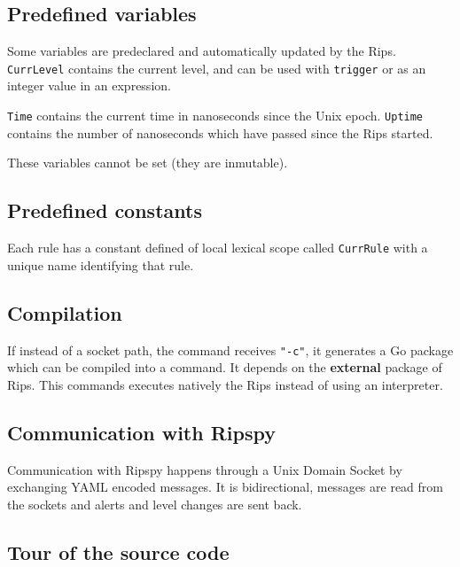 \documentclass[a4paper]{article}
\begin{document}
\subsection{Predefined variables}
Some variables are predeclared and automatically updated by the Rips.
\verb+CurrLevel+ contains the current level, and can be used with \texttt{trigger}  or
as an integer value in an expression.

\verb+Time+ contains the current time in nanoseconds since the Unix epoch.
\verb+Uptime+ contains the number of nanoseconds which have passed since
the Rips started.

These variables cannot be set (they are inmutable).

\subsection{Predefined constants}

Each rule has a constant defined of local lexical scope called \verb+CurrRule+ with
a unique name identifying that rule.

\subsection{Compilation}

If instead of a socket path, the command receives \verb+"-c"+, it generates a Go
package which can be compiled into a command. It depends on the \textbf{external}
package of Rips.
This commands executes natively the Rips instead of using an interpreter.

\subsection{Communication with Ripspy}

Communication with Ripspy happens through a Unix Domain Socket by
exchanging YAML encoded messages.
It is bidirectional, messages are read from the sockets and
alerts and level changes are sent back.

\subsection{Tour of the source code}
\end{document}
